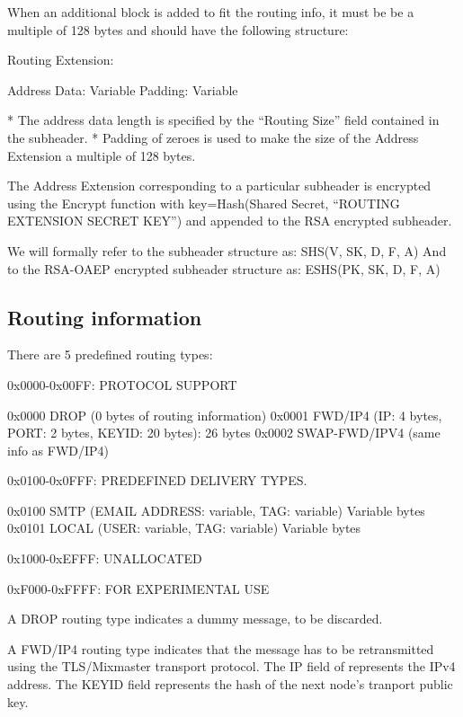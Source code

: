   When an additional block is added to fit the routing info, it must be be a
  multiple of 128 bytes and should have the following structure:
 
  Routing Extension:

    Address Data:     Variable
    Padding:          Variable

* The address data length is specified by the ``Routing Size'' field
  contained in the subheader.
* Padding of zeroes is used to make the size of the Address Extension a
multiple of 128 bytes.  

The Address Extension corresponding to a particular subheader is
encrypted using the Encrypt function with key=Hash(Shared Secret,
``ROUTING EXTENSION SECRET KEY'') and appended to the RSA encrypted
subheader.

We will formally refer to the subheader structure as:
SHS(V, SK, D, F, A)
And to the RSA-OAEP encrypted subheader structure as:
ESHS(PK, SK, D, F, A)

\subsection{Routing information}

There are 5 predefined routing types:

0x0000-0x00FF: PROTOCOL SUPPORT

0x0000 DROP    (0 bytes of routing information)
0x0001 FWD/IP4 (IP: 4 bytes, PORT: 2 bytes, KEYID: 20 bytes): 26 bytes
0x0002 SWAP-FWD/IPV4 (same info as FWD/IP4)

0x0100-0x0FFF: PREDEFINED DELIVERY TYPES.

0x0100 SMTP   (EMAIL ADDRESS: variable, TAG: variable) Variable bytes
0x0101 LOCAL  (USER: variable, TAG: variable) Variable bytes

0x1000-0xEFFF: UNALLOCATED

0xF000-0xFFFF: FOR EXPERIMENTAL USE

A DROP routing type indicates a dummy message, to be discarded.

A FWD/IP4 routing type indicates that the message has to be
retransmitted using the TLS/Mixmaster transport protocol. The IP field
of represents the IPv4 address.  The KEYID field represents the hash of
the next node's tranport public key.

